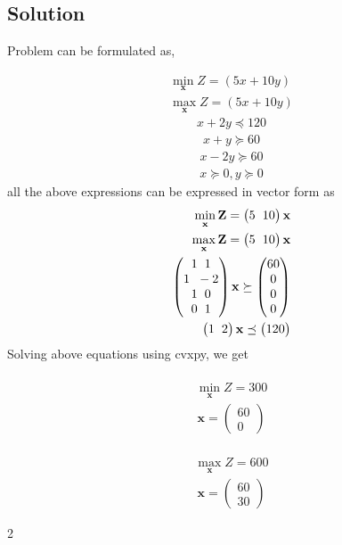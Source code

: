 \documentclass{article}
\newcommand{\myvec}[1]{\ensuremath{\begin{pmatrix}#1\end{pmatrix}}}
\let\vec\mathbf
\begin{document}
\begin{multicols}{2}
\section*{Solution}
\begin{flushleft}
Problem can be formulated as,\\
\end{flushleft}
\begin{align}
\min_{\vec{x}} Z=(5x+10y)\\
\max_{\vec{x}} Z=(5x+10y)
\end{align}
\begin{align*}
x+2y \preceq 120
\end{align*}
\begin{align*}
x+y \succeq 60
\end{align*}
\begin{align*}
x-2y \succeq 60
\end{align*}
\begin{align*}
x \succeq 0 , y \succeq 0
\end{align*}
all the above expressions can be expressed in vector form as
\begin{align*}
\min_{\vec{x}}\vec{Z}=\myvec{5 \hspace{0.2cm}10}\vec{x}\\
\max_{\vec{x}}\vec{Z}=\myvec{5 \hspace{0.2cm}10}\vec{x}\\
\myvec{1 \hspace{0.2cm}1\\
       1 \hspace{0.2cm}-2\\
       1 \hspace{0.2cm}0\\
       0 \hspace{0.2cm}1}\vec{x}\succeq \myvec{60 \\0\\0\\0}\\   
 \myvec{1 \hspace{0.2cm}2}\vec{x}\preceq \myvec{120}  
\end{align*}
Solving above equations using cvxpy, we get\\
\vspace{0.1cm}\\
\begin{align}
\min_{\vec{x}} Z=300
\end{align}
\begin{align}
\vec{x}=\myvec{60\\0}
\end{align}
\vspace{0.1cm}\\
\begin{align}
\max_{\vec{x}} Z=600
\end{align}
\begin{align}
\vec{x}=\myvec{60\\30}
\end{align}
\end{multicols}{2}
\end{document}
